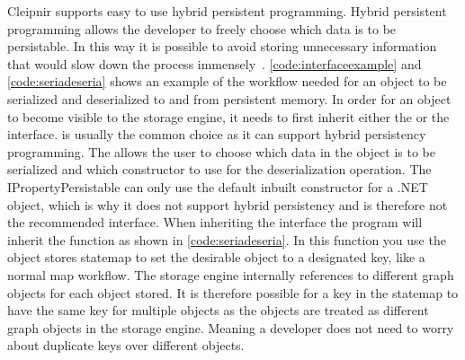 Cleipnir supports easy to use hybrid persistent programming. Hybrid persistent programming allows the developer to freely choose which data is to be persistable. In this way it is possible to avoid storing unnecessary information that would slow down the process immensely~\cite[p.~9-10]{PAPER:PaxosCleipnir}. \autoref{code:interfaceexample} and \autoref{code:seriadeseria} shows an example of the workflow needed for an object to be serialized and deserialized to and from persistent memory. In order for an object to become visible to the storage engine, it needs to first inherit either the  or the  interface.  is usually the common choice as it can support hybrid persistency programming. The  allows the user to choose which data in the object is to be serialized and which constructor to use for the deserialization operation. The IPropertyPersistable can only use the default inbuilt constructor for a .NET object, which is why it does not support hybrid persistency and is therefore not the recommended interface.
When inheriting the  interface the program will inherit the  function as shown in \autoref{code:seriadeseria}. In this function you use the object stores statemap to set the desirable object to a designated key, like a normal map workflow. The storage engine internally references to different graph objects for each object stored. It is therefore possible for a key in the statemap to have the same key for multiple objects as the objects are treated as different graph objects in the storage engine. Meaning a developer does not need to worry about duplicate keys over different objects.

